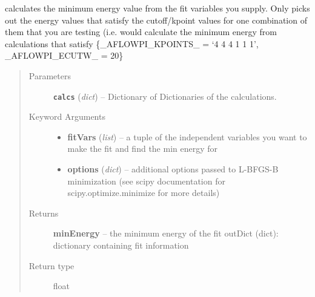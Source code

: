 \documentclass[letterpaper,10pt,english]{sphinxmanual}
\begin{document}
\begin{fulllineitems}
\label{pseudo:pseudo.__getMin}
calculates the minimum energy value from the fit variables you supply.
Only picks out the energy values that satisfy the cutoff/kpoint values
for one combination of them that you are testing
(i.e. would calculate the minimum energy from calculations that satisfy
\{\_AFLOWPI\_KPOINTS\_ = `4 4 4 1 1 1', \_AFLOWPI\_ECUTW\_ = 20\}
\begin{quote}\begin{description}
\item[{Parameters}] \leavevmode
\textbf{\texttt{calcs}} (\emph{dict}) -- Dictionary of Dictionaries of the calculations.

\item[{Keyword Arguments}] \leavevmode\begin{itemize}
\item {} 
\textbf{fitVars} (\emph{list}) --
a tuple of the independent variables you want to make the
fit and find the min energy for

\item {} 
\textbf{options} (\emph{dict}) --
additional options passed to L-BFGS-B minimization
(see scipy documentation for scipy.optimize.minimize
for more details)

\end{itemize}

\item[{Returns}] \leavevmode
\textbf{minEnergy} --
the minimum energy of the fit
outDict (dict): dictionary containing fit information

\item[{Return type}] \leavevmode
float

\end{description}\end{quote}

\end{fulllineitems}

\end{document}
